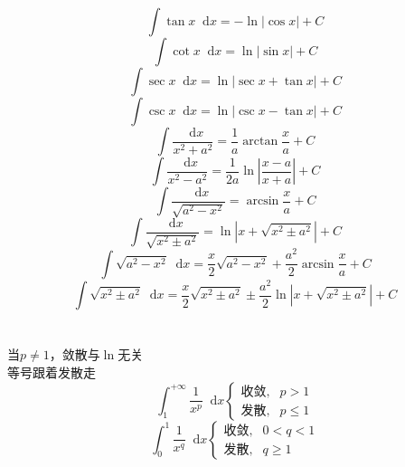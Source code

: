 \documentclass[]{article}
\newcommand*{\dif}{\mathop{}\!\mathrm{d}}
\numberwithin{equation}{section}
\begin{document}
\section{}
\begin{equation}
    \int\tan x\dif x=-\ln\left|\cos x\right|+C
\end{equation}
\begin{equation}
    \int\cot x\dif x=\ln\left|\sin x\right|+C
\end{equation}
\begin{equation}
    \int\sec x\dif x=\ln\left|\sec x+\tan x\right|+C
\end{equation}
\begin{equation}
    \int\csc x\dif x=\ln\left|\csc x-\tan x\right|+C
\end{equation}
\begin{equation}
    \int\frac{\dif x}{x^2+a^2}=\frac{1}{a}\arctan\frac{x}{a}+C
\end{equation}
\begin{equation}
    \int\frac{\dif x}{x^2-a^2}=\frac{1}{2a}\ln\left|\frac{x-a}{x+a}\right|+C
\end{equation}
\begin{equation}
    \int\frac{\dif x}{\sqrt{a^2-x^2}}=\arcsin\frac{x}{a}+C
\end{equation}
\begin{equation}
    \int\frac{\dif x}{\sqrt{x^2\pm a^2}}=\ln\left|x+\sqrt{x^2\pm a^2}\right|+C
\end{equation}
\begin{equation}
    \int\sqrt{a^2-x^2}\dif x=\frac{x}{2}\sqrt{a^2-x^2}+\frac{a^2}{2}\arcsin\frac{x}{a}+C
\end{equation}
\begin{equation}
    \int\sqrt{x^2\pm a^2}\dif x=\frac{x}{2}\sqrt{x^2\pm a^2}\pm\frac{a^2}{2}\ln\left|x+\sqrt{x^2\pm a^2}\right|+C
\end{equation}

\section{}
当$p\ne1$，敛散与$\ln$无关\\
等号跟着发散走
\begin{equation}
    \int_1^{+\infty}\frac{1}{x^p}\dif x
    \begin{cases}
        \text{收敛}, & p>1   \\
        \text{发散}, & p\le1
    \end{cases}
\end{equation}
\begin{equation}
    \int_0^1\frac{1}{x^q}\dif x
    \begin{cases}
        \text{收敛}, & 0<q<1 \\
        \text{发散}, & q\ge1
    \end{cases}
\end{equation}
\end{document}
